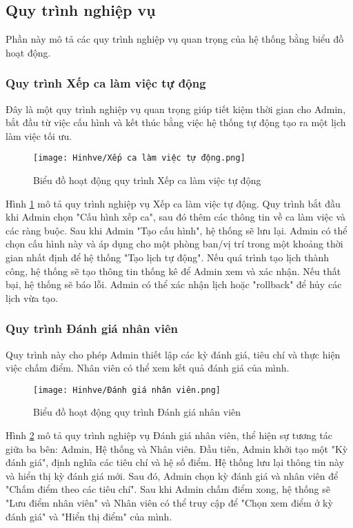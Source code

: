 \documentclass[../DoAn.tex]{subfiles}
\begin{document}
\subsection{Quy trình nghiệp vụ}
\label{subsection:2.2.3}
Phần này mô tả các quy trình nghiệp vụ quan trọng của hệ thống bằng biểu đồ hoạt động.

\subsubsection{Quy trình Xếp ca làm việc tự động}
Đây là một quy trình nghiệp vụ quan trọng giúp tiết kiệm thời gian cho Admin, bắt đầu từ việc cấu hình và kết thúc bằng việc hệ thống tự động tạo ra một lịch làm việc tối ưu.
\begin{figure}[H]
    \centering
    \texttt{[image: Hinhve/Xếp ca làm việc tự động.png]}
    \caption{Biểu đồ hoạt động quy trình Xếp ca làm việc tự động}
    \label{fig:act_xeplich}
\end{figure}

Hình \ref{fig:act_xeplich} mô tả quy trình nghiệp vụ Xếp ca làm việc tự động. Quy trình bắt đầu khi Admin chọn "Cấu hình xếp ca", sau đó thêm các thông tin về ca làm việc và các ràng buộc. Sau khi Admin "Tạo cấu hình", hệ thống sẽ lưu lại. Admin có thể chọn cấu hình này và áp dụng cho một phòng ban/vị trí trong một khoảng thời gian nhất định để hệ thống "Tạo lịch tự động". Nếu quá trình tạo lịch thành công, hệ thống sẽ tạo thông tin thống kê để Admin xem và xác nhận. Nếu thất bại, hệ thống sẽ báo lỗi. Admin có thể xác nhận lịch hoặc "rollback" để hủy các lịch vừa tạo.

\subsubsection{Quy trình Đánh giá nhân viên}
Quy trình này cho phép Admin thiết lập các kỳ đánh giá, tiêu chí và thực hiện việc chấm điểm. Nhân viên có thể xem kết quả đánh giá của mình.
\begin{figure}[H]
    \centering
    \texttt{[image: Hinhve/Đánh giá nhân viên.png]}
    \caption{Biểu đồ hoạt động quy trình Đánh giá nhân viên}
    \label{fig:act_danhgia}
\end{figure}

Hình \ref{fig:act_danhgia} mô tả quy trình nghiệp vụ Đánh giá nhân viên, thể hiện sự tương tác giữa ba bên: Admin, Hệ thống và Nhân viên. Đầu tiên, Admin khởi tạo một "Kỳ đánh giá", định nghĩa các tiêu chí và hệ số điểm. Hệ thống lưu lại thông tin này và hiển thị kỳ đánh giá mới. Sau đó, Admin chọn kỳ đánh giá và nhân viên để "Chấm điểm theo các tiêu chí". Sau khi Admin chấm điểm xong, hệ thống sẽ "Lưu điểm nhân viên" và Nhân viên có thể truy cập để "Chọn xem điểm ở kỳ đánh giá" và "Hiển thị điểm" của mình.
\end{document}
